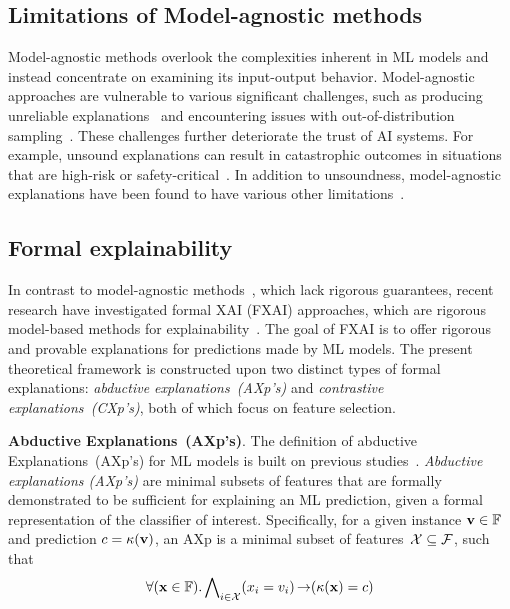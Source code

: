 \subsection{Limitations of Model-agnostic methods}

Model-agnostic methods overlook the complexities inherent in ML models
and instead concentrate on examining its input-output behavior.
%
Model-agnostic approaches are vulnerable to various significant challenges, 
such as producing unreliable explanations~\cite{inms-corr19,nsmims-sat19,ignatiev-ijcai20,msi-aaai22} 
and encountering issues with out-of-distribution sampling~\cite{lakkaraju-aies20a,lb-aies20,yis-corr23,yfis-corr23}.
%
These challenges further deteriorate the trust of AI systems.
%
For example, unsound explanations can result in catastrophic outcomes in situations
that are high-risk or safety-critical~\cite{rudin-nature22,rudin-natmi19,vw-pt21,raai-sp19,dmbt-comp17,hcw-chb21}.
% 
In addition to unsoundness, model-agnostic explanations have been found to have various 
other limitations~\cite{lakkaraju-aies20a,lb-aies20,dbjw-ecai20,kvsf-icml20,huang-corr23}.

\subsection{Formal explainability}

In contrast to model-agnostic methods~\cite{guestrin-kdd16,lundberg-nips17,guestrin-aaai18,guidotti-acmcs19}, 
which lack rigorous guarantees, recent research have investigated formal XAI (FXAI) approaches,
which are rigorous model-based methods for explainability~\cite{ignatiev-ijcai20,msi-aaai22,ms-rw22,msi-fai23,iims-jair22}.
%
The goal of FXAI is to offer rigorous and provable explanations for predictions made by ML models.
%
The present theoretical framework is constructed upon two distinct types of formal explanations:
\emph{abductive explanations~(AXp's)} and \emph{contrastive explanations~(CXp's)},
both of which focus on feature selection.

\textbf{Abductive Explanations~(AXp's)}. 
The definition of abductive Explanations~(AXp's) for ML models is built on previous 
studies~\cite{darwiche-ijcai18,inms-aaai19,darwiche-ecai20,marquis-kr20,msi-aaai22}.
%
\emph{Abductive explanations (AXp's)} are minimal subsets of features that are formally 
demonstrated to be sufficient for explaining an ML prediction, 
given a formal representation of the classifier of interest.
%
Specifically, for a given instance $\mathbf{v} \in \mathbb{F}$ and 
prediction $c = \kappa(\mathbf{v})$, an AXp is a minimal subset of features~${\mathcal{X}} \subseteq {\mathcal{F}}$,
such that
\begin{equation}\label{eq:axp}
	\forall(\mathbf{x} \in \mathbb{F}). \bigwedge\nolimits_{i \in {\mathcal{X}}} 
	(x_i = v_i) \operatorname*{\rightarrow} (\kappa(\mathbf{x}) = c)
\end{equation}

